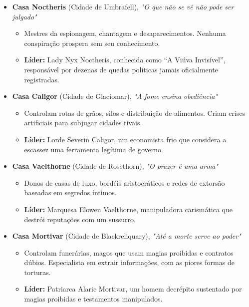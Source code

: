 \begin{itemize}
    \item \textbf{\ringmfamily Casa Noctheris} (Cidade de Umbrafell), \textit{"O que não se vê não pode ser julgado"}
    \begin{itemize}
        \item Mestres da espionagem, chantagem e desaparecimentos. Nenhuma conspiração prospera sem seu conhecimento.
        \item \textbf{\ringmfamily Líder:} Lady Nyx Noctheris, conhecida como “A Viúva Invisível”, responsável por dezenas de quedas políticas jamais oficialmente registradas.
    \end{itemize}
    
    \item \textbf{\ringmfamily Casa Caligor} (Cidade de Glaciomar), \textit{"A fome ensina obediência"}
    \begin{itemize}
        \item Controlam rotas de grãos, silos e distribuição de alimentos. Criam crises artificiais para subjugar cidades rivais.
        \item \textbf{\ringmfamily Líder:} Lorde Severin Caligor, um economista frio que considera a escassez uma ferramenta legítima de governo.
    \end{itemize}
    
    \item \textbf{\ringmfamily Casa Vaelthorne} (Cidade de Rosethorn), \textit{"O prazer é uma arma"}
    \begin{itemize}
        \item Donos de casas de luxo, bordéis aristocráticos e redes de extorsão baseadas em segredos íntimos.
        \item \textbf{\ringmfamily Líder:} Marquesa Elowen Vaelthorne, manipuladora carismática que destrói reputações com um sussurro.
    \end{itemize}
    
    \item \textbf{\ringmfamily Casa Mortivar} (Cidade de Blackreliquary), \textit{"Até a morte serve ao poder"}
    \begin{itemize}
        \item Controlam funerárias, magos que usam magias proibidas e contratos dúbios. Especialista em extrair informações, com as piores formas de torturas.
        \item \textbf{\ringmfamily Líder:} Patriarca Alaric Mortivar, um homem decrépito sustentado por magias proibidas e testamentos manipulados.
    \end{itemize}
    

\end{itemize}
